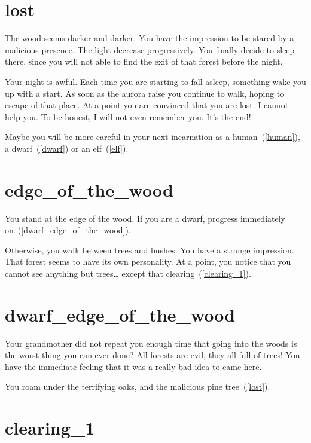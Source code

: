 \section{lost}

The wood seems darker and darker. You have the impression to be stared by a
malicious presence. The light decrease progressively. You finally decide to
sleep there, since you will not able to find the exit of that forest before the
night.

Your night is awful. Each time you are starting to fall asleep, something wake
you up with a start. As soon as the aurora raise you continue to walk, hoping to
escape of that place. At a point you are convinced that you are lost. I cannot
help you. To be honest, I will not even remember you. It's the end!

\medbreak

Maybe you will be more careful in your next incarnation as a
human~(\ref{human}), a dwarf~(\ref{dwarf}) or an elf~(\ref{elf}).

\section{edge_of_the_wood}

You stand at the edge of the wood. If you are a dwarf, progress immediately
on~(\ref{dwarf_edge_of_the_wood}).

\medbreak

Otherwise, you walk between trees and bushes. You have a strange impression.
That forest seems to have its own personality. At a point, you notice that you
cannot see anything but trees… except that clearing~(\ref{clearing_1}).

\section{dwarf_edge_of_the_wood}

Your grandmother did not repeat you enough time that going into the woods is
the worst thing you can ever done? All forests are evil, they all full of trees!
You have the immediate feeling that it was a really bad idea to came here.

You roam under the terrifying oaks, and the malicious pine tree~(\ref{lost}).

\section{clearing_1}

